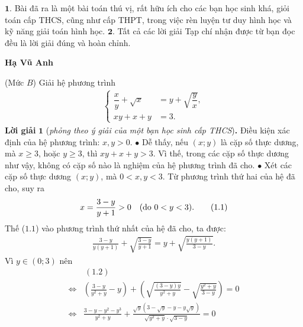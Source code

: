 \begin{multicols}{2}
	$\pmb{1.}$ Bài đã ra là một bài toán thú vị, rất hữu ích cho các bạn học sinh khá, giỏi toán cấp THCS, cũng như cấp THPT, trong việc rèn luyện tư duy hình học và kỹ năng giải toán hình học.
	\vskip 0.05cm
	$\pmb{2.}$ Tất cả các lời giải Tạp chí nhận được từ bạn đọc đều là lời giải đúng và hoàn chỉnh.
	\begin{flushright}
		\textbf{\color{thachthuctoanhoc}Hạ Vũ Anh}
	\end{flushright}
	{}
	(Mức $B$) Giải hệ phương trình 
	\begin{align*}
		\begin{cases}
			\dfrac{x}{y}+\sqrt{x}&=y+\sqrt{\dfrac{y}{x}},
			\\x y+x+y&=3.
		\end{cases}
	\end{align*}
	\textbf{\color{thachthuctoanhoc}Lời giải} $\pmb{1}$ (\textit{phỏng theo ý giải của một bạn học sinh cấp THCS})\textbf{\color{thachthuctoanhoc}.}
	\vskip 0.05cm
	Điều kiện xác định của hệ phương trình: $x, y > 0$.
	\vskip 0.05cm
	$\bullet$ Dễ thấy, nếu $(x; y)$ là cặp số thực dương, mà $x \ge 3$, hoặc $y \ge 3$, thì $xy + x + y > 3$. Vì thế, trong các cặp số thực dương như vậy, không có cặp số nào là nghiệm của hệ phương trình đã cho.
	\vskip 0.05cm
	$\bullet$ Xét các cặp số thực dương $(x; y)$, mà \linebreak$0 < x, y < 3$.
	\vskip 0.05cm
	Từ phương trình thứ hai của hệ đã cho, suy ra
	\begin{align*}
		x = \frac{{3 - y}}{{y + 1}} > 0  \quad(\text{\color{black}do } 0 < y < 3).      \tag{$1.1$}
	\end{align*}
	Thế ($1.1$) vào phương trình thứ nhất của hệ đã cho, ta được:
	\begin{align*}
		\frac{{3 \!-\! y}}{{y\left( {y \!+\! 1} \right)}} \!+\! \sqrt {\frac{{3 \!-\! y}}{{y \!+\! 1}}}  \!=\! y \!+\! \sqrt {\frac{{y\left( {y \!+\! 1} \right)}}{{3 \!-\! y}}}. \tag{$1.2$}
	\end{align*}
	Vì $y \in (0; 3)$ nên
	\begin{align*}
		&\,(1.2) \\
		\Leftrightarrow &\left(\!{\frac{{3 \!-\! y}}{{{y^2} \!+\! y}} \!-\! y}\! \right) \!+\!\! \left(\!\!\!\! {\sqrt {\frac{{\left( {3 \!-\! y} \right)y}}{{{y^2} \!+\! y}}}  \!-\! \sqrt {\frac{{{y^2} \!+\! y}}{{3 \!-\! y}}} } \right) \!\!=\! 0\\
		\Leftrightarrow &\frac{{3 \!-\! y \!-\! {y^2} \!-\! {y^3}}}{{{y^2} \!+\! y}} \!+\! \frac{{\sqrt y \left( {3 \!-\! \sqrt y  \!-\! y \!-\! y\sqrt y } \right)}}{{\sqrt {{y^2} \!+\! y}  \!\cdot\! \sqrt {3 \!-\! y} }} \!=\! 0\\

\end{align*}
\end{multicols}
